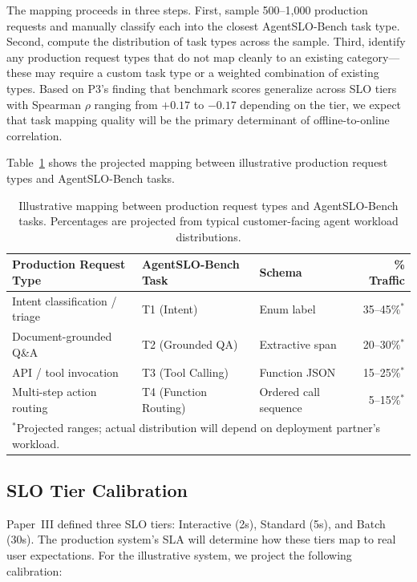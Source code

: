 \documentclass[11pt]{article}
\begin{document}
The mapping proceeds in three steps. First, sample 500--1,000 production requests and manually classify each into the closest AgentSLO-Bench task type. Second, compute the distribution of task types across the sample. Third, identify any production request types that do not map cleanly to an existing category---these may require a custom task type or a weighted combination of existing types. Based on P3's finding that benchmark scores generalize across SLO tiers with Spearman $\rho$ ranging from $+0.17$ to $-0.17$ depending on the tier, we expect that task mapping quality will be the primary determinant of offline-to-online correlation.

Table~\ref{tab:task-mapping} shows the projected mapping between illustrative production request types and AgentSLO-Bench tasks.

\begin{table}[t]
\centering
\caption{Illustrative mapping between production request types and AgentSLO-Bench tasks. Percentages are projected from typical customer-facing agent workload distributions.}
\label{tab:task-mapping}
\small
\begin{tabular}{lllr}
\toprule
\textbf{Production Request Type} & \textbf{AgentSLO-Bench Task} & \textbf{Schema} & \textbf{\% Traffic} \\
\midrule
Intent classification / triage & T1 (Intent) & Enum label & 35--45\%$^{*}$ \\
Document-grounded Q\&A & T2 (Grounded QA) & Extractive span & 20--30\%$^{*}$ \\
API / tool invocation & T3 (Tool Calling) & Function JSON & 15--25\%$^{*}$ \\
Multi-step action routing & T4 (Function Routing) & Ordered call sequence & 5--15\%$^{*}$ \\
\bottomrule
\multicolumn{4}{l}{\footnotesize $^{*}$Projected ranges; actual distribution will depend on deployment partner's workload.}
\end{tabular}
\end{table}

\subsection{SLO Tier Calibration}

Paper~III defined three SLO tiers: Interactive (2s), Standard (5s), and Batch (30s). The production system's SLA will determine how these tiers map to real user expectations. For the illustrative system, we project the following calibration:
\end{document}
